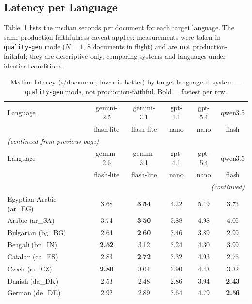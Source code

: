 \subsection{Latency per Language}

Table~\ref{tab:appendix-latency-full} lists the median seconds per document for
each target language. The same production-faithfulness caveat applies:
measurements were taken in \texttt{quality-gen} mode ($N{=}1$, 8
documents in flight) and are \textbf{not} production-faithful; they are
descriptive only, comparing systems and languages under identical conditions.

\begingroup
\scriptsize
\setlength{\tabcolsep}{3pt}
\begin{longtable}{@{}lccccc@{}}
    \caption{Median latency (s/document, lower is better) by target language
    $\times$ system --- \texttt{quality-gen} mode, not production-faithful.
    Bold = fastest per row.}
    \label{tab:appendix-latency-full} \\
    \toprule
    Language & gemini-2.5 & gemini-3.1 & gpt-4.1 & gpt-5.4 & qwen3.5 \\
     & flash-lite & flash-lite & nano & nano & flash \\
    \midrule
    \endfirsthead
    \multicolumn{6}{l}{\textit{(continued from previous page)}} \\
    \toprule
    Language & gemini-2.5 & gemini-3.1 & gpt-4.1 & gpt-5.4 & qwen3.5 \\
     & flash-lite & flash-lite & nano & nano & flash \\
    \midrule
    \endhead
    \midrule
    \multicolumn{6}{r}{\textit{(continued)}} \\
    \endfoot
    \bottomrule
    \endlastfoot
    Egyptian Arabic (ar\_EG) & 3.68 & \textbf{3.54} & 4.22 & 5.19 & 3.73 \\
    Arabic (ar\_SA) & 3.74 & \textbf{3.50} & 3.88 & 4.98 & 4.05 \\
    Bulgarian (bg\_BG) & 2.64 & \textbf{2.60} & 3.46 & 3.89 & 2.99 \\
    Bengali (bn\_IN) & \textbf{2.52} & 3.12 & 3.24 & 4.30 & 3.99 \\
    Catalan (ca\_ES) & 2.83 & \textbf{2.72} & 3.32 & 4.93 & 2.76 \\
    Czech (cs\_CZ) & \textbf{2.80} & 3.04 & 3.90 & 4.43 & 3.32 \\
    Danish (da\_DK) & 2.53 & 2.48 & 2.86 & 3.94 & \textbf{2.43} \\
    German (de\_DE) & 2.92 & 2.89 & 3.64 & 4.79 & \textbf{2.56} \\

\end{longtable}
